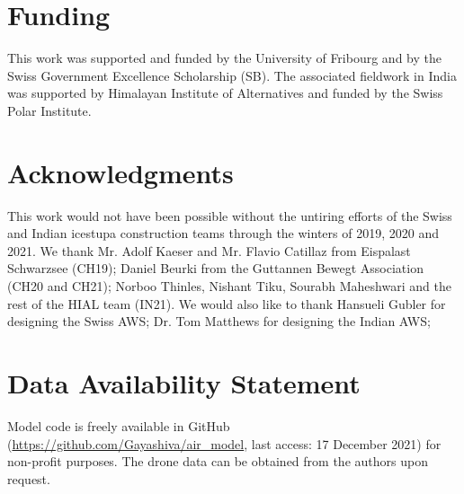 \documentclass[utf8]{frontiersSCNS}
\begin{document}
\section*{Funding} This work was supported and funded by the University of Fribourg and by the Swiss Government
Excellence Scholarship (SB). The associated fieldwork in India was supported by Himalayan Institute of
Alternatives and funded by the Swiss Polar Institute.

\section*{Acknowledgments} 
This work would not have been possible without the untiring efforts of the Swiss and
Indian icestupa construction teams through the winters of 2019, 2020 and 2021. We thank Mr. Adolf Kaeser and Mr.
Flavio Catillaz from Eispalast Schwarzsee (CH19); Daniel Beurki from the Guttannen Bewegt Association (CH20 and
CH21); Norboo Thinles, Nishant Tiku, Sourabh Maheshwari and the rest of the HIAL team (IN21).  We would also
like to thank Hansueli Gubler for designing the Swiss AWS; Dr. Tom Matthews for designing the Indian AWS;

\section*{Data Availability Statement} Model code is freely available in GitHub
(\url{https://github.com/Gayashiva/air_model}, last access: 17 December 2021) for non-profit purposes. The drone
data can be obtained from the authors upon request.

 
\end{document}
